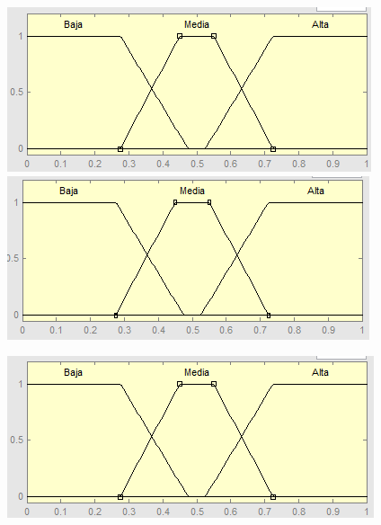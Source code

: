 \begin{figure}[H]
	\centering
	\begin{minipage}{.5\textwidth}
		\centering
		\includegraphics[scale=0.67]{images/variables/vrpa.png}
	\end{minipage}%
	\begin{minipage}{.5\textwidth}
		\centering
		\includegraphics[scale=0.67]{images/variables/vrpc.png}
	\end{minipage}
\end{figure}

\begin{figure}[H]
	\centering
	\begin{minipage}{.5\textwidth}
		\centering
		\includegraphics[scale=0.67]{images/variables/vrpd.png}
	\end{minipage}%
	\begin{minipage}{.5\textwidth}
		\centering
	\end{minipage}
\end{figure}


